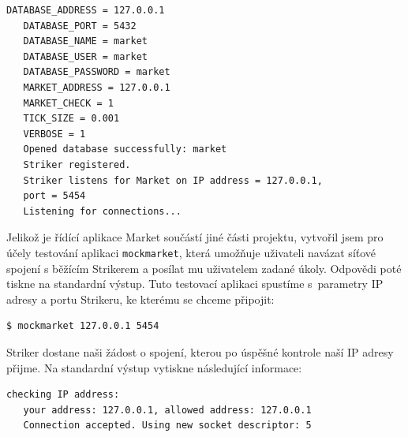 \documentclass[thesis=M,czech]{FITthesis}[2012/06/26]
\begin{document}
\begin{lstlisting}[basicstyle={\small\ttfamily}] 
   DATABASE_ADDRESS = 127.0.0.1                                                                                       
   DATABASE_PORT = 5432                                                                                               
   DATABASE_NAME = market                                                                                           
   DATABASE_USER = market                                                                                           
   DATABASE_PASSWORD = market                                                                                       
   MARKET_ADDRESS = 127.0.0.1                                                                                         
   MARKET_CHECK = 1                                                                                                   
   TICK_SIZE = 0.001
   VERBOSE = 1                                                                                                        
   Opened database successfully: market                                                                             
   Striker registered.                                                                                                
   Striker listens for Market on IP address = 127.0.0.1,
   port = 5454                                                  
   Listening for connections...
\end{lstlisting}

Jelikož je řídící aplikace Market součástí jiné části projektu, vytvořil jsem pro účely testování aplikaci \texttt{mockmarket}, 
která umožňuje uživateli navázat síťové spojení s běžícím Strikerem a posílat mu uživatelem zadané úkoly. Odpovědi 
poté tiskne na standardní výstup. Tuto testovací aplikaci spustíme s~parametry IP adresy a portu Strikeru, ke kterému 
se chceme připojit:

\begin{lstlisting}[basicstyle={\small\ttfamily}] 
   $ mockmarket 127.0.0.1 5454
\end{lstlisting}

Striker dostane naši žádost o spojení, kterou po úspěšné kontrole naší IP adresy přijme. Na standardní výstup vytiskne 
následující informace:

\begin{lstlisting}[basicstyle={\small\ttfamily}] 
   checking IP address:                                                                                               
   your address: 127.0.0.1, allowed address: 127.0.0.1                                                                
   Connection accepted. Using new socket descriptor: 5                                                                
\end{lstlisting}
\end{document}
